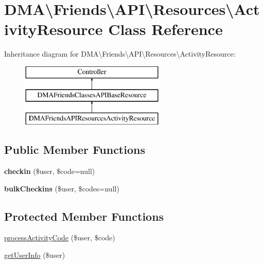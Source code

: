 \hypertarget{classDMA_1_1Friends_1_1API_1_1Resources_1_1ActivityResource}{}\section{D\+M\+A\textbackslash{}Friends\textbackslash{}A\+P\+I\textbackslash{}Resources\textbackslash{}Activity\+Resource Class Reference}
\label{classDMA_1_1Friends_1_1API_1_1Resources_1_1ActivityResource}
Inheritance diagram for D\+M\+A\textbackslash{}Friends\textbackslash{}A\+P\+I\textbackslash{}Resources\textbackslash{}Activity\+Resource\+:\begin{figure}[H]
\begin{center}
\leavevmode
\includegraphics[height=3.000000cm]{dd/df6/classDMA_1_1Friends_1_1API_1_1Resources_1_1ActivityResource}
\end{center}
\end{figure}
\subsection*{Public Member Functions}
\begin{DoxyCompactItemize}
\item 
\hypertarget{classDMA_1_1Friends_1_1API_1_1Resources_1_1ActivityResource_a4eccb55dc505bfc92562fe37db80eda6}{}{\bfseries checkin} (\$user, \$code=null)\label{classDMA_1_1Friends_1_1API_1_1Resources_1_1ActivityResource_a4eccb55dc505bfc92562fe37db80eda6}

\item 
\hypertarget{classDMA_1_1Friends_1_1API_1_1Resources_1_1ActivityResource_ab69cc3a390f04db714de20bf7d131eac}{}{\bfseries bulk\+Checkins} (\$user, \$codes=null)\label{classDMA_1_1Friends_1_1API_1_1Resources_1_1ActivityResource_ab69cc3a390f04db714de20bf7d131eac}

\end{DoxyCompactItemize}
\subsection*{Protected Member Functions}
\begin{DoxyCompactItemize}
\item 
\hyperlink{classDMA_1_1Friends_1_1API_1_1Resources_1_1ActivityResource_a671a3b78b007929728a958a3d1c1973f}{process\+Activity\+Code} (\$user, \$code)
\item 
\hyperlink{classDMA_1_1Friends_1_1API_1_1Resources_1_1ActivityResource_a6e69dac62efaef2226446bcb4a9537d4}{get\+User\+Info} (\$user)
\end{DoxyCompactItemize}
